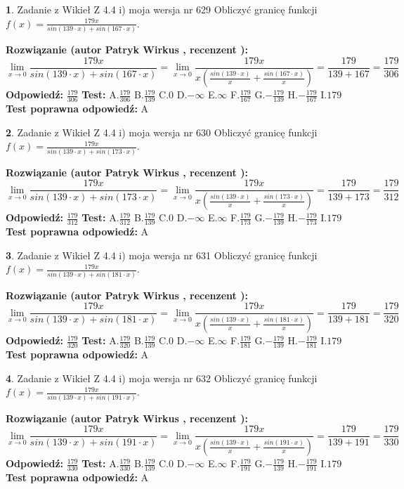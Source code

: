 \documentclass[12pt, a4paper]{article}
\theoremstyle{definition} %
\newtheorem{zad}{}
\newcommand{\zadStart}[1]{\begin{zad}#1\newline}
\newcommand{\zadStop}{\end{zad}}
\newcommand{\rozwStart}[2]{\noindent \textbf{Rozwiązanie (autor #1 , recenzent #2): }\newline}
\newcommand{\rozwStop}{\newline}
\newcommand{\odpStart}{\noindent \textbf{Odpowiedź:}\newline}
\newcommand{\odpStop}{\newline}
\newcommand{\testStart}{\noindent \textbf{Test:}\newline}
\newcommand{\testStop}{\newline}
\newcommand{\kluczStart}{\noindent \textbf{Test poprawna odpowiedź:}\newline}
\newcommand{\kluczStop}{\newline}
\begin{document}
\zadStart{Zadanie z Wikieł Z 4.4 i) moja wersja nr 629}
Obliczyć granicę funkcji $f(x)=\frac{179x}{sin(139\cdot x) +sin(167\cdot x)}$.
\zadStop
\rozwStart{Patryk Wirkus}{}
$$\lim\limits_{x\to 0}\frac{179x}{sin(139\cdot x) +sin(167\cdot x)}=\lim\limits_{x\to 0}\frac{179x}{x(\frac{sin(139\cdot x)}{x}+\frac{sin(167\cdot x)}{x})}=\frac{179}{139+167} = \frac{179}{306}$$
\rozwStop
\odpStart
$\frac{179}{306}$
\odpStop
\testStart
A.$\frac{179}{306}$
B.$\frac{179}{139}$
C.$0$
D.$-\infty$
E.$\infty$
F.$\frac{179}{167}$
G.$-\frac{179}{139}$
H.$-\frac{179}{167}$
I.$179$
\testStop
\kluczStart
A
\kluczStop



\zadStart{Zadanie z Wikieł Z 4.4 i) moja wersja nr 630}
Obliczyć granicę funkcji $f(x)=\frac{179x}{sin(139\cdot x) +sin(173\cdot x)}$.
\zadStop
\rozwStart{Patryk Wirkus}{}
$$\lim\limits_{x\to 0}\frac{179x}{sin(139\cdot x) +sin(173\cdot x)}=\lim\limits_{x\to 0}\frac{179x}{x(\frac{sin(139\cdot x)}{x}+\frac{sin(173\cdot x)}{x})}=\frac{179}{139+173} = \frac{179}{312}$$
\rozwStop
\odpStart
$\frac{179}{312}$
\odpStop
\testStart
A.$\frac{179}{312}$
B.$\frac{179}{139}$
C.$0$
D.$-\infty$
E.$\infty$
F.$\frac{179}{173}$
G.$-\frac{179}{139}$
H.$-\frac{179}{173}$
I.$179$
\testStop
\kluczStart
A
\kluczStop



\zadStart{Zadanie z Wikieł Z 4.4 i) moja wersja nr 631}
Obliczyć granicę funkcji $f(x)=\frac{179x}{sin(139\cdot x) +sin(181\cdot x)}$.
\zadStop
\rozwStart{Patryk Wirkus}{}
$$\lim\limits_{x\to 0}\frac{179x}{sin(139\cdot x) +sin(181\cdot x)}=\lim\limits_{x\to 0}\frac{179x}{x(\frac{sin(139\cdot x)}{x}+\frac{sin(181\cdot x)}{x})}=\frac{179}{139+181} = \frac{179}{320}$$
\rozwStop
\odpStart
$\frac{179}{320}$
\odpStop
\testStart
A.$\frac{179}{320}$
B.$\frac{179}{139}$
C.$0$
D.$-\infty$
E.$\infty$
F.$\frac{179}{181}$
G.$-\frac{179}{139}$
H.$-\frac{179}{181}$
I.$179$
\testStop
\kluczStart
A
\kluczStop



\zadStart{Zadanie z Wikieł Z 4.4 i) moja wersja nr 632}
Obliczyć granicę funkcji $f(x)=\frac{179x}{sin(139\cdot x) +sin(191\cdot x)}$.
\zadStop
\rozwStart{Patryk Wirkus}{}
$$\lim\limits_{x\to 0}\frac{179x}{sin(139\cdot x) +sin(191\cdot x)}=\lim\limits_{x\to 0}\frac{179x}{x(\frac{sin(139\cdot x)}{x}+\frac{sin(191\cdot x)}{x})}=\frac{179}{139+191} = \frac{179}{330}$$
\rozwStop
\odpStart
$\frac{179}{330}$
\odpStop
\testStart
A.$\frac{179}{330}$
B.$\frac{179}{139}$
C.$0$
D.$-\infty$
E.$\infty$
F.$\frac{179}{191}$
G.$-\frac{179}{139}$
H.$-\frac{179}{191}$
I.$179$
\testStop
\kluczStart
A
\kluczStop
\end{document}
